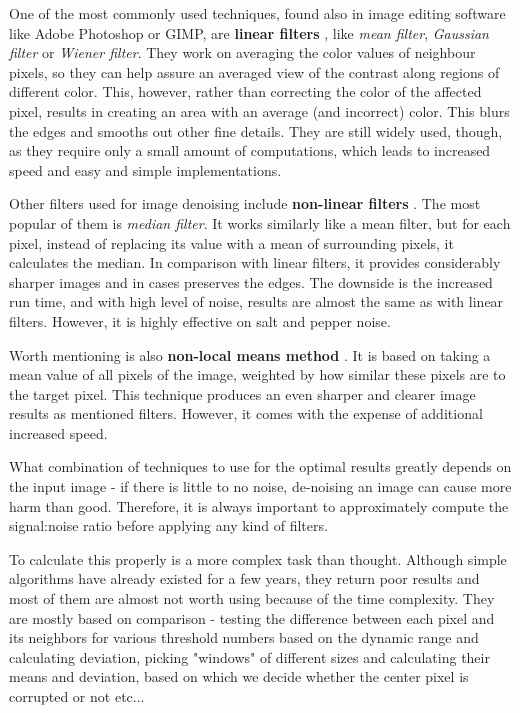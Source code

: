 \begin{description}

\item One of the most commonly used techniques, found also in image editing software like Adobe Photoshop or GIMP, are \textbf{linear filters} \citep{denoisingTechniques}, like \emph{mean filter}, \emph{Gaussian filter} or \emph{Wiener filter}. They work on averaging the color values of neighbour pixels, so they can help assure an averaged view of the contrast along regions of different color. This, however, rather than correcting the color of the affected pixel, results in creating an area with an average (and incorrect) color. This blurs the edges and smooths out other fine details. They are still widely used, though, as they require only a small amount of computations, which leads to increased speed and easy and simple implementations.

\item Other filters used for image denoising include \textbf{non-linear filters} \citep{denoisingTechniques}. The most popular of them is \emph{median filter}. It works similarly like a mean filter, but for each pixel, instead of replacing its value with a mean of surrounding pixels, it calculates the median. In comparison with linear filters, it provides considerably sharper images and in cases preserves the edges. The downside is the increased run time, and with high level of noise, results are almost the same as with linear filters. However, it is highly effective on salt and pepper noise.

\item Worth mentioning is also \textbf{non-local means method} \citep{nonLocalMeans}. It is based on taking a mean value of all pixels of the image, weighted by how similar these pixels are to the target pixel. This technique produces an even sharper and clearer image results as mentioned filters. However, it comes with the expense of additional increased speed.

\end{description}

What combination of techniques to use for the optimal results greatly depends on the input image - if there is little to no noise, de-noising an image can cause more harm than good. Therefore, it is always important to approximately compute the signal:noise ratio before applying any kind of filters.

To calculate this properly is a more complex task than thought. Although simple algorithms have already existed for a few years, they return poor results and most of them are almost not worth using because of the time complexity. They are mostly based on comparison - testing the difference between each pixel and its neighbors for various threshold numbers based on the dynamic range and calculating deviation, picking "windows" of different sizes and calculating their means and deviation, based on which we decide whether the center pixel is corrupted or not etc...


